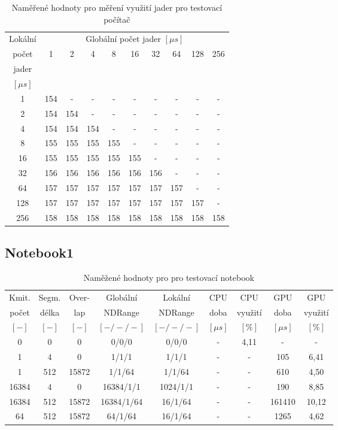 \begin{table}[htbp]
\centering
\label{tab:pc1mvj}
\caption{Naměřené hodnoty pro měření využití jader pro testovací počítač}
\begin{tabular}{|c|c|c|c|c|c|c|c|c|c|}
\hline
Lokální & \multicolumn{9}{c|}{Globální počet jader $\left[ \mu s\right]$}\\
počet & 1 & 2&4&8&16&32&64&128&256\\
jader & &&&&&&&& \\
$\left[ \mu s\right]$ &&&&&&&&&\\
\hline
1&154&-&-&-&-&-&-&-&-\\
2&154&154&-&-&-&-&-&-&-\\
4&154&154&154&-&-&-&-&-&-\\
8&155&155&155&155&-&-&-&-&-\\
16&155&155&155&155&155&-&-&-&-\\
32&156&156&156&156&156&156&-&-&-\\
64&157&157&157&157&157&157&157&-&-\\
128&157&157&157&157&157&157&157&157&-\\
256&158&158&158&158&158&158&158&158&158\\
\hline
\end{tabular}
\end{table}


\subsection{Notebook1}
\begin{table}[!h]
\centering
\caption{Naměžené hodnoty pro pro testovací notebook}
\begin{tabular}{|c|c|c|c|c|c|c|c|c|}
\hline
Kmit. & Segm. & Over- & Globální & Lokální & CPU & CPU & GPU & GPU\\
počet & délka & lap & NDRange & NDRange & doba & využití & doba & využití\\
$\left[ - \right]$ & $\left[ - \right]$ & $\left[ - \right]$ &$\left[ -/-/- \right]$ & $\left[ -/-/- \right]$ & $\left[ \mu s\right]$ & $\left[ \% \right]$ & $\left[ \mu s \right]$ & $\left[ \% \right]$\\
\hline
0&0&0&0/0/0&0/0/0&-&4,11&-&-\\
1&4&0&1/1/1&1/1/1&-&-&105&6,41\\
1&512&15872&1/1/64&1/1/64&-&-&610&4,50\\
16384&4&0&16384/1/1&1024/1/1&-&-&190&8,85\\
16384&512&15872&16384/1/64&16/1/64&-&-&161410&10,12\\
64&512&15872&64/1/64&16/1/64&-&-&1265&4,62\\
\hline
\end{tabular}
\end{table}

